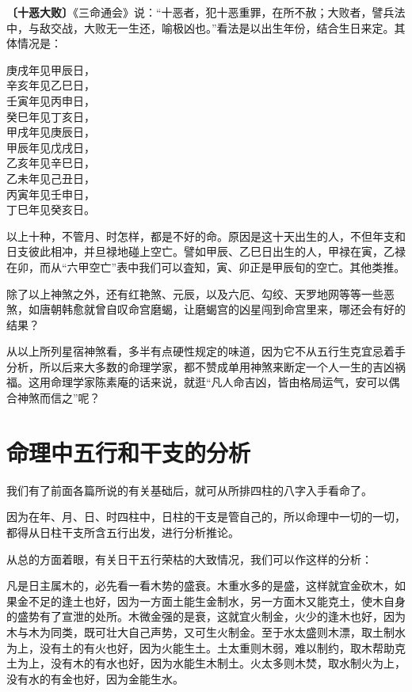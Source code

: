 \documentclass[a5paper,oneside,12pt]{ctexbook}
\newenvironment{tightcenter}{%
  \setlength\topsep{0pt}
  \setlength\parskip{0pt}
  \begin{center}\kaishu 
}{%
  \end{center}
}
\begin{document}
\textbf{〔十恶大败〕}《三命通会》说：“十恶者，犯十恶重罪，在所不赦；大败者，譬兵法中，与敌交战，大败无一生还，喻极凶也。”看法是以出生年份，结合生日来定。其体情况是：
\begin{tightcenter}
庚戌年见甲辰日，\\
辛亥年见乙巳日，\\
壬寅年见丙申日，\\
癸巳年见丁亥日，\\
甲戌年见庚辰日，\\
甲辰年见戊戌日，\\
乙亥年见辛巳日，\\
乙未年见己丑日，\\
丙寅年见壬申日，\\
丁巳年见癸亥日。\\
\end{tightcenter}

以上十种，不管月、时怎样，都是不好的命。原因是这十天出生的人，不但年支和日支彼此相冲，并旦禄地碰上空亡。譬如甲辰、乙巳日出生的人，甲禄在寅，乙禄在卯，而从“六甲空亡”表中我们可以査知，寅、卯正是甲辰旬的空亡。其他类推。

除了以上神煞之外，还有红艳煞、元辰，以及六厄、勾绞、天罗地网等等一些恶煞，如唐朝韩愈就曾自叹命宫磨蝎，让磨蝎宫的凶星闯到命宫里来，哪还会有好的结果？

从以上所列星宿神煞看，多半有点硬性规定的味道，因为它不从五行生克宜忌着手分析，所以后来大多数的命理学家，都不赞成单用神煞来断定一个人一生的吉凶祸福。这用命理学家陈素庵的话来说，就逛“凡人命吉凶，皆由格局运气，安可以偶合神煞而信之”呢？

\section{命理中五行和干支的分析}

我们有了前面各篇所说的有关基础后，就可从所排四柱的八字入手看命了。

因为在年、月、日、时四柱中，日柱的干支是管自己的，所以命理中一切的一切，都得从日柱干支所含五行出发，进行分析推论。

从总的方面着眼，有关日干五行荣枯的大致情况，我们可以作这样的分析：

凡是日主属木的，必先看一看木势的盛衰。木重水多的是盛，这样就宜金砍木，如果金不足的逢土也好，因为一方面土能生金制水，另一方面木又能克土，使木自身的盛势有了宣泄的处所。木微金强的是衰，这就宜火制金，火少的逢木也好，因为木与木为同类，既可壮大自己声势，又可生火制金。至于水太盛则木漂，取土制水为上，没有土的有火也好，因为火能生土。土太重则木弱，难以制约，取木帮助克土为上，没有木的有水也好，因为水能生木制土。火太多则木焚，取水制火为上，没有水的有金也好，因为金能生水。
\end{document}
